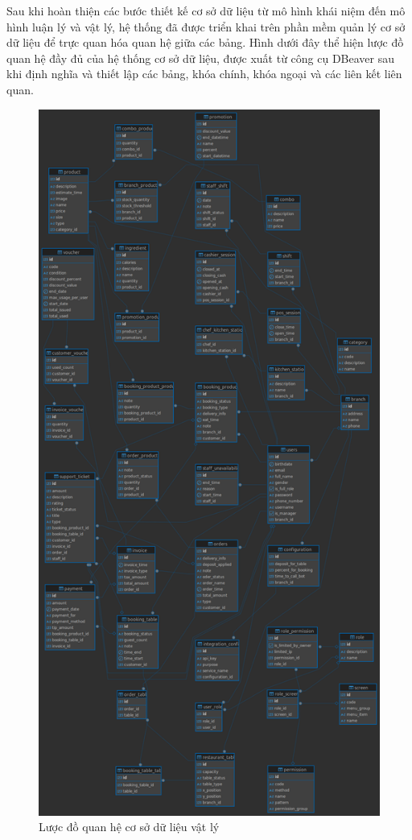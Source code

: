 Sau khi hoàn thiện các bước thiết kế cơ sở dữ liệu từ mô hình khái niệm đến mô hình luận lý và vật lý, hệ thống đã được triển khai trên phần mềm quản lý cơ sở dữ liệu để trực quan hóa quan hệ giữa các bảng. Hình dưới đây thể hiện lược đồ quan hệ đầy đủ của hệ thống cơ sở dữ liệu, được xuất từ công cụ DBeaver sau khi định nghĩa và thiết lập các bảng, khóa chính, khóa ngoại và các liên kết liên quan.

\begin{figure}[H]
	\centering
	\includegraphics[height=0.9\textheight]{Images/ldqh.png}
	\vspace{0.5cm}
	\caption{Lược đồ quan hệ cơ sở dữ liệu vật lý}
	\label{fig:logical_schema}
\end{figure}